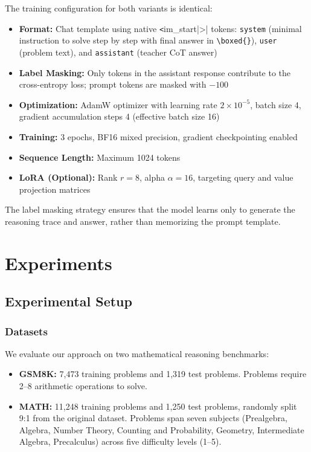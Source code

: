 \documentclass{article}
\begin{document}
The training configuration for both variants is identical:

\begin{itemize}[leftmargin=*]
    \item \textbf{Format:} Chat template using native \verb|<|im\_start|>| tokens: \texttt{system} (minimal instruction to solve step by step with final answer in \texttt{\textbackslash{}boxed\{\}}), \texttt{user} (problem text), and \texttt{assistant} (teacher CoT answer)
    \item \textbf{Label Masking:} Only tokens in the assistant response contribute to the cross-entropy loss; prompt tokens are masked with $-100$
    \item \textbf{Optimization:} AdamW optimizer with learning rate $2 \times 10^{-5}$, batch size 4, gradient accumulation steps 4 (effective batch size 16)
    \item \textbf{Training:} 3 epochs, BF16 mixed precision, gradient checkpointing enabled
    \item \textbf{Sequence Length:} Maximum 1024 tokens
    \item \textbf{LoRA (Optional):} Rank $r = 8$, alpha $\alpha = 16$, targeting query and value projection matrices
\end{itemize}

The label masking strategy ensures that the model learns only to generate the reasoning trace and answer, rather than memorizing the prompt template.


\section{Experiments}

\subsection{Experimental Setup}

\subsubsection{Datasets}

We evaluate our approach on two mathematical reasoning benchmarks:
\begin{itemize}[leftmargin=*]
    \item \textbf{GSM8K:} 7,473 training problems and 1,319 test problems. Problems require 2--8 arithmetic operations to solve.
    \item \textbf{MATH:} 11,248 training problems and 1,250 test problems, randomly split 9:1 from the original dataset. Problems span seven subjects (Prealgebra, Algebra, Number Theory, Counting and Probability, Geometry, Intermediate Algebra, Precalculus) across five difficulty levels (1--5).
\end{itemize}
\end{document}
